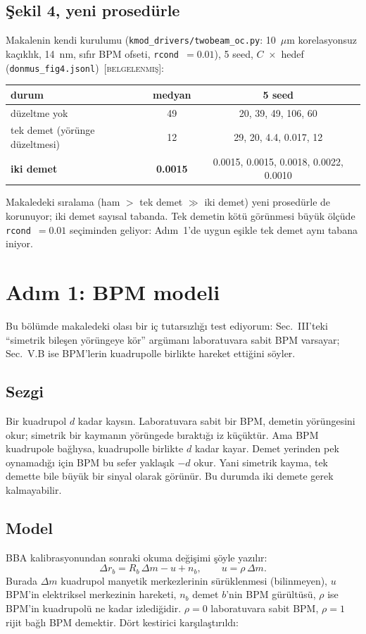 \documentclass[11pt,a4paper]{article}
\newcommand{\kod}[1]{{\XeTeXinterchartokenstate=0\texttt{#1}}}
\newcommand{\BEL}{\textsc{[belgelenmiş]}}
\begin{document}
\subsection{Şekil 4, yeni prosedürle}
Makalenin kendi kurulumu (\kod{kmod\_drivers/twobeam\_oc.py}: 10~$\mu$m korelasyonsuz kaçıklık, 14~nm,
sıfır BPM ofseti, \kod{rcond}~$=0.01$), 5 seed, $C$~$\times$~hedef (\kod{donmus\_fig4.jsonl})~\BEL:
\begin{center}\small
\begin{tabular}{lcc}
\toprule
durum & medyan & 5 seed \\
\midrule
düzeltme yok & 49 & 20, 39, 49, 106, 60 \\
tek demet (yörünge düzeltmesi) & 12 & 29, 20, 4.4, 0.017, 12 \\
\textbf{iki demet} & \textbf{0.0015} & 0.0015, 0.0015, 0.0018, 0.0022, 0.0010 \\
\bottomrule
\end{tabular}
\end{center}
Makaledeki sıralama (ham $>$ tek demet $\gg$ iki demet) yeni prosedürle de korunuyor; iki demet sayısal
tabanda. Tek demetin kötü görünmesi büyük ölçüde \kod{rcond}~$=0.01$ seçiminden geliyor: Adım~1'de uygun
eşikle tek demet aynı tabana iniyor.

\section{Adım 1: BPM modeli}

Bu bölümde makaledeki olası bir iç tutarsızlığı test ediyorum: Sec.~III'teki ``simetrik bileşen
yörüngeye kör'' argümanı laboratuvara sabit BPM varsayar; Sec.~V.B ise BPM'lerin kuadrupolle birlikte
hareket ettiğini söyler.

\subsection{Sezgi}
Bir kuadrupol $d$ kadar kaysın. Laboratuvara sabit bir BPM, demetin yörüngesini okur; simetrik bir kaymanın
yörüngede bıraktığı iz küçüktür. Ama BPM kuadrupole bağlıysa, kuadrupolle birlikte $d$ kadar kayar. Demet
yerinden pek oynamadığı için BPM bu sefer yaklaşık $-d$ okur. Yani simetrik kayma, tek demette bile
büyük bir sinyal olarak görünür. Bu durumda iki demete gerek kalmayabilir.

\subsection{Model}
BBA kalibrasyonundan sonraki okuma değişimi şöyle yazılır:
\begin{equation}
\Delta r_b = R_b\,\Delta m - u + n_b ,\qquad u=\rho\,\Delta m .
\end{equation}
Burada $\Delta m$ kuadrupol manyetik merkezlerinin sürüklenmesi (bilinmeyen), $u$ BPM'in elektriksel
merkezinin hareketi, $n_b$ demet $b$'nin BPM gürültüsü, $\rho$ ise BPM'in kuadrupolü ne kadar izlediğidir.
$\rho=0$ laboratuvara sabit BPM, $\rho=1$ rijit bağlı BPM demektir. Dört kestirici karşılaştırıldı:
\end{document}
